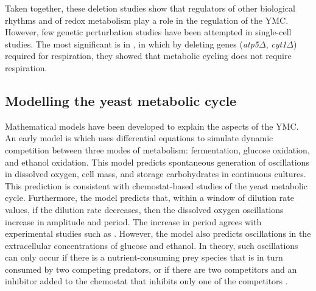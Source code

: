 Taken together, these deletion studies show that regulators of other biological rhythms and of redox metabolism play a role in the regulation of the YMC\@.
However, few genetic perturbation studies have been attempted in single-cell studies.
The most significant is in \textcite{baumgartnerFlavinbasedMetabolicCycles2018}, in which by deleting genes (\textit{atp5$\Delta$}, \textit{cyt1$\Delta$}) required for respiration, they showed that metabolic cycling does not require respiration.

\subsection{Modelling the yeast metabolic cycle}
\label{subsec:intro-ymc-model}


Mathematical models have been developed to explain the aspects of the YMC\@.
An early model is \textcite{jonesCyberneticModelGrowth1999} which uses differential equations to simulate dynamic competition between three modes of metabolism: fermentation, glucose oxidation, and ethanol oxidation.
This model predicts spontaneous generation of oscillations in dissolved oxygen, cell mass, and storage carbohydrates in continuous cultures.
This prediction is consistent with chemostat-based studies of the yeast metabolic cycle.
Furthermore, the model predicts that, within a window of dilution rate values, if the dilution rate decreases, then the dissolved oxygen oscillations increase in amplitude and period.
The increase in period agrees with experimental studies such as \textcite{oneillEukaryoticCellBiology2020}.
However, the model also predicts oscillations in the extracellular concentrations of glucose and ethanol.
In theory, such oscillations can only occur if there is a nutrient-consuming prey species that is in turn consumed by two competing predators, or if there are two competitors and an inhibitor added to the chemostat that inhibits only one of the competitors \parencite{smithTheoryChemostatDynamics1995}. %

